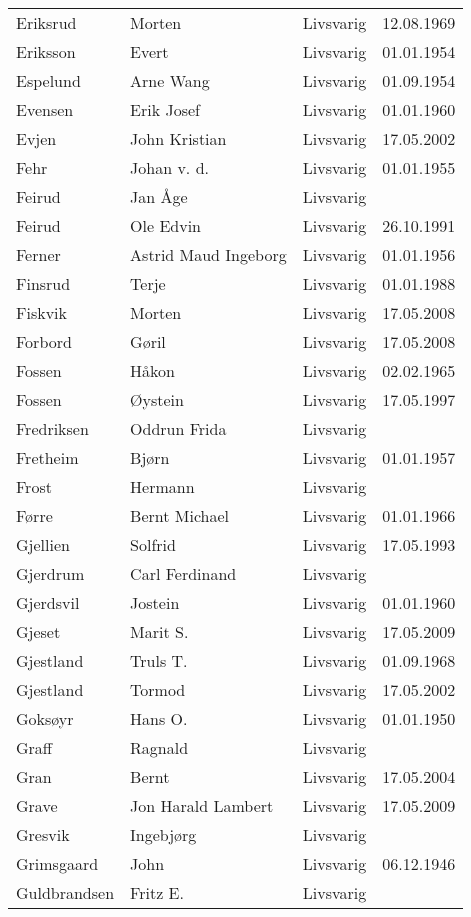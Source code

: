 \documentclass[fsbok.tex]{subfiles}
\begin{document}
\begin{longtable}{llll}
Eriksrud	&	Morten	&	Livsvarig 	&	12.08.1969	\\
Eriksson	&	Evert	&	Livsvarig 	&	01.01.1954	\\
Espelund	&	Arne Wang	&	Livsvarig 	&	01.09.1954	\\
Evensen	&	Erik Josef	&	Livsvarig 	&	01.01.1960	\\
Evjen 	&	John Kristian	&	Livsvarig	&	17.05.2002	\\
Fehr	&	Johan v. d.	&	Livsvarig 	&	01.01.1955	\\
Feirud  &	Jan Åge		&	Livsvarig	&			\\
Feirud	&	Ole Edvin	&	Livsvarig 	&	26.10.1991	\\
Ferner	&	Astrid Maud Ingeborg	&	Livsvarig 	&	01.01.1956	\\
Finsrud	&	Terje	&	Livsvarig 	&	01.01.1988	\\
Fiskvik	&	Morten	&	Livsvarig	&	17.05.2008	\\
Forbord	&	Gøril	&	Livsvarig	&	17.05.2008	\\
Fossen	&	Håkon	&	Livsvarig 	&	02.02.1965	\\
Fossen 	&	Øystein	&	Livsvarig	&	17.05.1997	\\
Fredriksen &	Oddrun Frida &	Livsvarig	&			\\
Fretheim	&	Bjørn	&	Livsvarig 	&	01.01.1957	\\
Frost	&	Hermann	&	Livsvarig 	&		\\
Førre	&	Bernt Michael	&	Livsvarig 	&	01.01.1966	\\
Gjellien	&	Solfrid	&	Livsvarig 	&	17.05.1993	\\
Gjerdrum	&	Carl Ferdinand	&	Livsvarig 	&		\\
Gjerdsvil	&	Jostein	&	Livsvarig 	&	01.01.1960	\\
Gjeset	&	Marit S.	&	Livsvarig	&	17.05.2009	\\
Gjestland	&	Truls T. 	&	Livsvarig 	&	01.09.1968	\\
Gjestland 	&	Tormod	&	Livsvarig	&	17.05.2002	\\
Goksøyr	&	Hans O.	&	Livsvarig 	&	01.01.1950	\\
Graff	&	Ragnald	&	Livsvarig 	&		\\
Gran 	&	Bernt	&	Livsvarig	&	17.05.2004	\\
Grave	&	Jon Harald Lambert	&	Livsvarig	&	17.05.2009	\\
Gresvik	&	Ingebjørg	&	Livsvarig 	&		\\
Grimsgaard	&	John	&	Livsvarig 	&	06.12.1946	\\
Guldbrandsen	&	Fritz E. 	&	Livsvarig 	&		\\

\end{longtable}
\end{document}

